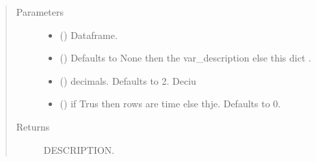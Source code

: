\documentclass[letterpaper,10pt,english]{sphinxmanual}
\begin{document}
\begin{fulllineitems}
\begin{fulllineitems}
\end{fulllineitems}


\begin{fulllineitems}
\label{\detokenize{core/modelclass:modelclass.Display_Mixin.ibsstyle}}
\pysigstartsignatures
{}
\pysigstopsignatures\begin{quote}\begin{description}
\item[{Parameters}] \leavevmode\begin{itemize}
\item {} 
\sphinxAtStartPar
{} () \textendash{} Dataframe.

\item {} 
\sphinxAtStartPar
{} (\sphinxstyleliteralemphasis{\sphinxupquote{, }}) \textendash{} Defaults to None then the var\_description else this dict .

\item {} 
\sphinxAtStartPar
{} (\sphinxstyleliteralemphasis{\sphinxupquote{, }}) \textendash{} decimals. Defaults to 2. Deciu

\item {} 
\sphinxAtStartPar
{} (\sphinxstyleliteralemphasis{\sphinxupquote{, }}) \textendash{} if Trus then rows are time else thje. Defaults to 0.

\end{itemize}

\item[{Returns}] \leavevmode
\sphinxAtStartPar
DESCRIPTION.


\end{description}
\end{quote}
\end{fulllineitems}
\end{fulllineitems}
\end{document}
